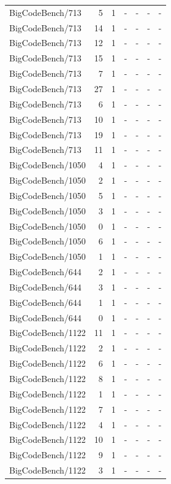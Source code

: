 \begin{longtable}{lrrllll}
BigCodeBench/713 & 5 & 1 & - & - & - & - \\
BigCodeBench/713 & 14 & 1 & - & - & - & - \\
BigCodeBench/713 & 12 & 1 & - & - & - & - \\
BigCodeBench/713 & 15 & 1 & - & - & - & - \\
BigCodeBench/713 & 7 & 1 & - & - & - & - \\
BigCodeBench/713 & 27 & 1 & - & - & - & - \\
BigCodeBench/713 & 6 & 1 & - & - & - & - \\
BigCodeBench/713 & 10 & 1 & - & - & - & - \\
BigCodeBench/713 & 19 & 1 & - & - & - & - \\
BigCodeBench/713 & 11 & 1 & - & - & - & - \\
BigCodeBench/1050 & 4 & 1 & - & - & - & - \\
BigCodeBench/1050 & 2 & 1 & - & - & - & - \\
BigCodeBench/1050 & 5 & 1 & - & - & - & - \\
BigCodeBench/1050 & 3 & 1 & - & - & - & - \\
BigCodeBench/1050 & 0 & 1 & - & - & - & - \\
BigCodeBench/1050 & 6 & 1 & - & - & - & - \\
BigCodeBench/1050 & 1 & 1 & - & - & - & - \\
BigCodeBench/644 & 2 & 1 & - & - & - & - \\
BigCodeBench/644 & 3 & 1 & - & - & - & - \\
BigCodeBench/644 & 1 & 1 & - & - & - & - \\
BigCodeBench/644 & 0 & 1 & - & - & - & - \\
BigCodeBench/1122 & 11 & 1 & - & - & - & - \\
BigCodeBench/1122 & 2 & 1 & - & - & - & - \\
BigCodeBench/1122 & 6 & 1 & - & - & - & - \\
BigCodeBench/1122 & 8 & 1 & - & - & - & - \\
BigCodeBench/1122 & 1 & 1 & - & - & - & - \\
BigCodeBench/1122 & 7 & 1 & - & - & - & - \\
BigCodeBench/1122 & 4 & 1 & - & - & - & - \\
BigCodeBench/1122 & 10 & 1 & - & - & - & - \\
BigCodeBench/1122 & 9 & 1 & - & - & - & - \\
BigCodeBench/1122 & 3 & 1 & - & - & - & - \\

\end{longtable}
